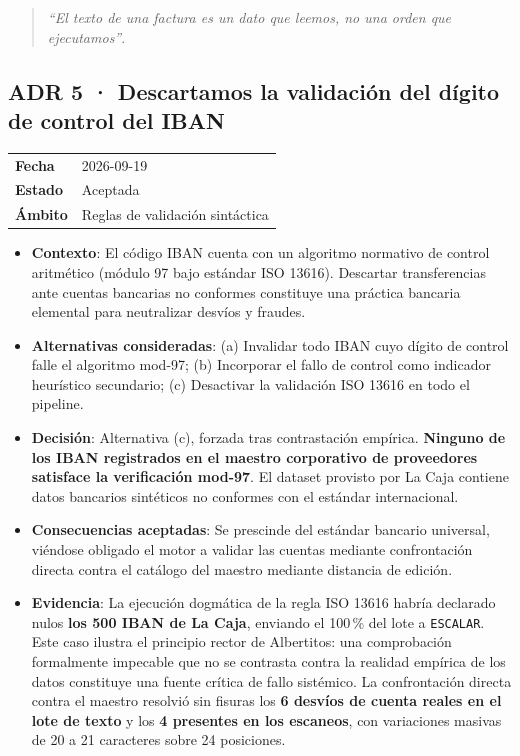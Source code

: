 \documentclass[11pt,a4paper]{article}
\begin{document}
\begin{quote}
\textit{``El texto de una factura es un dato que leemos, no una orden que ejecutamos''}.
\end{quote}

\subsection{ADR 5 · Descartamos la validación del dígito de control del IBAN}
\begin{table}[htbp]
\centering\small
\begin{tabular}{ll}
\toprule
\textbf{Fecha} & 2026-09-19 \\
\textbf{Estado} & Aceptada \\
\textbf{Ámbito} & Reglas de validación sintáctica \\
\bottomrule
\end{tabular}
\end{table}

\begin{itemize}[leftmargin=*, label={--}]
    \item \textbf{Contexto}: El código IBAN cuenta con un algoritmo normativo de control aritmético (módulo 97 bajo estándar ISO 13616). Descartar transferencias ante cuentas bancarias no conformes constituye una práctica bancaria elemental para neutralizar desvíos y fraudes.
    \item \textbf{Alternativas consideradas}: (a) Invalidar todo IBAN cuyo dígito de control falle el algoritmo mod-97; (b) Incorporar el fallo de control como indicador heurístico secundario; (c) Desactivar la validación ISO 13616 en todo el pipeline.
    \item \textbf{Decisión}: Alternativa (c), forzada tras contrastación empírica. \textbf{Ninguno de los IBAN registrados en el maestro corporativo de proveedores satisface la verificación mod-97}. El dataset provisto por La Caja contiene datos bancarios sintéticos no conformes con el estándar internacional.
    \item \textbf{Consecuencias aceptadas}: Se prescinde del estándar bancario universal, viéndose obligado el motor a validar las cuentas mediante confrontación directa contra el catálogo del maestro mediante distancia de edición.
    \item \textbf{Evidencia}: La ejecución dogmática de la regla ISO 13616 habría declarado nulos \textbf{los 500 IBAN de La Caja}, enviando el 100\,\% del lote a \texttt{ESCALAR}. Este caso ilustra el principio rector de Albertitos: una comprobación formalmente impecable que no se contrasta contra la realidad empírica de los datos constituye una fuente crítica de fallo sistémico. La confrontación directa contra el maestro resolvió sin fisuras los \textbf{6 desvíos de cuenta reales en el lote de texto} y los \textbf{4 presentes en los escaneos}, con variaciones masivas de 20 a 21 caracteres sobre 24 posiciones.
\end{itemize}
\end{document}
